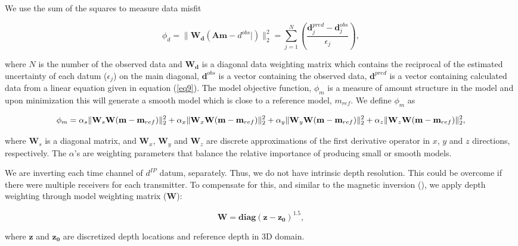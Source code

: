 \documentclass[extra,mreferee]{gji}
\newcommand{\dip}{d^{IP}}
\begin{document}
We use the sum of the squares to measure data misfit
\begin{linenomath*}
\begin{equation}
  \phi_d = \| \mathbf{W_d}(\mathbf{A}\mathbf{m}-d^{obs}|)\|^2_2 =
  \sum^N_{j=1}(\frac{\mathbf{d}^{pred}_j-\mathbf{d}^{obs}_j}{\epsilon_j}),
  \label{eq11}
\end{equation}
\end{linenomath*}
where $N$ is the number of the observed data and $\mathbf{W_d}$ is a diagonal data weighting matrix which contains the reciprocal of the estimated uncertainty of each datum ($\epsilon_j$) on the main diagonal,  $\mathbf{d}^{obs}$ is a vector containing the observed data, $\mathbf{d}^{pred}$ is a vector containing calculated data from a linear equation given in equation (\ref{eq9}).
The model objective function, $\phi_m$ is a measure of amount structure in the model and upon minimization this will generate a smooth model which is close to a reference model, $m_{ref}$. 
We define $\phi_m$ as
\begin{linenomath*}
\begin{equation}
  \phi_m = \alpha_s\| \mathbf{W}_s\mathbf{W}(\mathbf{m}-\mathbf{m}_{ref})\|^2_2+
       \alpha_x\| \mathbf{W}_x\mathbf{W}(\mathbf{m}-\mathbf{m}_{ref})\|^2_2+ \nonumber \\
       \alpha_y\| \mathbf{W}_y\mathbf{W}(\mathbf{m}-\mathbf{m}_{ref})\|^2_2+
       \alpha_z\| \mathbf{W}_z\mathbf{W}(\mathbf{m}-\mathbf{m}_{ref})\|^2_2,
  \label{eq12}
\end{equation}
\end{linenomath*}
where $\mathbf{W}_s$ is a diagonal matrix, and $\mathbf{W}_x$, $\mathbf{W}_y$ and $\mathbf{W}_z$ are discrete approximations of the first derivative operator in $x$, $y$ and $z$ directions, respectively.  
The $\alpha$'s are weighting parameters that balance the relative importance of producing small or smooth models.

We are inverting each time channel of $\dip$ datum, separately. Thus, we do not have intrinsic depth resolution. This could be overcome if there were multiple receivers for each transmitter. To compensate for this, and similar to the magnetic inversion (\cite{LiMag3D}), we apply depth weighting through model weighting matrix ($\mathbf{W}$):
\begin{linenomath*}
\begin{equation}
    \mathbf{W} = \mathbf{diag}(\mathbf{z-z_0})^{1.5},
    \label{eq: weight_mat}
\end{equation}
\end{linenomath*}
where $\mathbf{z}$ and $\mathbf{z_0}$ are discretized depth locations and reference depth in 3D domain.
\end{document}
